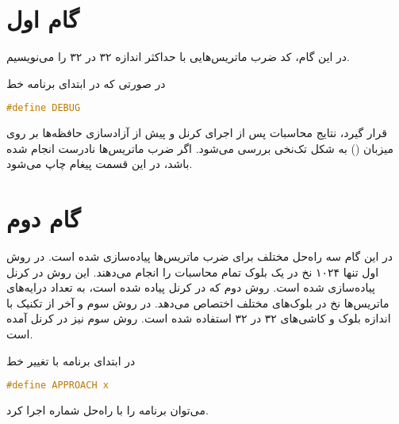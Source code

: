 \documentclass{HW}
\begin{document}
\pagestyle{pages}
\thispagestyle{first_page}

\section{گام اول}

در این گام، کد ضرب ماتریس‌هایی با حداکثر اندازه ۳۲ در ۳۲ را می‌نویسیم.

در صورتی که در ابتدای برنامه خط

\begin{latin}
\begin{lstlisting}[language=C, belowskip=-0.5\baselineskip]
#define DEBUG
\end{lstlisting}
\end{latin}

قرار گیرد، نتایج محاسبات پس از اجرای کرنل و پیش از آزادسازی حافظه‌ها بر روی میزبان () به شکل تک‌نخی بررسی می‌شود. اگر ضرب ماتریس‌ها نادرست انجام شده باشد، در این قسمت پیغام  چاپ می‌شود.


\section{گام دوم}

در این گام سه راه‌حل مختلف برای ضرب ماتریس‌ها پیاده‌سازی شده است. در روش اول تنها ۱۰۲۴ نخ در یک بلوک تمام محاسبات را انجام می‌دهند. این روش در کرنل  پیاده‌سازی شده است. روش دوم که در کرنل  پیاده شده است، به تعداد درایه‌های ماتریس‌ها نخ در بلوک‌های مختلف اختصاص می‌دهد. در روش سوم و آخر از تکنیک  با اندازه بلوک و کاشی‌های ۳۲ در ۳۲ استفاده شده است. روش سوم نیز در کرنل  آمده است.

در ابتدای برنامه با تغییر خط
\begin{latin}
\begin{lstlisting}[language=C, belowskip=-0.5\baselineskip]
#define APPROACH x
\end{lstlisting}
\end{latin}
می‌توان برنامه را با راه‌حل شماره  اجرا کرد.
\end{document}
